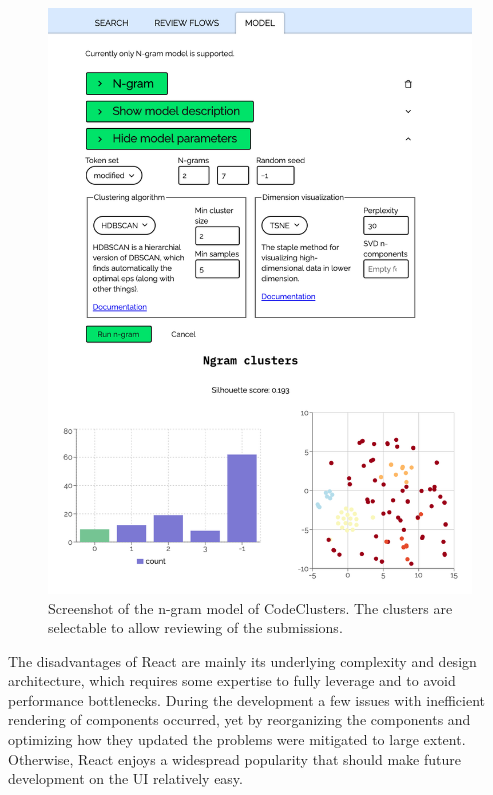 \begin{figure}
\begin{center}
    \includegraphics{images/cc-modeling.png}
    \caption{Screenshot of the n-gram model of CodeClusters. The clusters are selectable to allow reviewing of the submissions. \label{fig:cc-modeling}}
\end{center}
\end{figure}

The disadvantages of React are mainly its underlying complexity and design architecture, which requires some expertise to fully leverage and to avoid performance bottlenecks. During the development a few issues with inefficient rendering of components occurred, yet by reorganizing the components and optimizing how they updated the problems were mitigated to large extent. Otherwise, React enjoys a widespread popularity that should make future development on the UI relatively easy.

